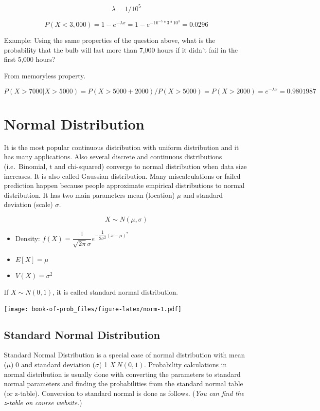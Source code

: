 \documentclass[]{book}
\theoremstyle{definition}
\theoremstyle{definition}
\theoremstyle{definition}
\theoremstyle{remark}
\begin{document}
\[\lambda = 1/10^5\]

\[P(X < 3,000) = 1 - e^{-\lambda x} = 1 - e^{- 10^{-5}*3*10^3} = 0.0296\]

Example: Using the same properties of the question above, what is the
probability that the bulb will last more than 7,000 hours if it didn't
fail in the first 5,000 hours?

From memoryless property.

\[P(X > 7000 | X > 5000) = P(X > 5000 + 2000)/P(X>5000) = P(X > 2000) = e^{-\lambda x} = 0.9801987\]

\hypertarget{normal-distribution}{%
\section{Normal Distribution}\label{normal-distribution}}

It is the most popular continuous distribution with uniform distribution
and it has many applications. Also several discrete and continuous
distributions (i.e.~Binomial, t and chi-squared) converge to normal
distribution when data size increases. It is also called Gaussian
distribution. Many miscalculations or failed prediction happen because
people approximate empirical distributions to normal distribution. It
has two main parameters mean (location) \(\mu\) and standard deviation
(scale) \(\sigma\).

\[X \sim N(\mu,\sigma)\]

\begin{itemize}
\item
  Density:
  \(f(X) = \dfrac{1}{\sqrt{2\pi}\sigma}e^{-\dfrac{1}{2\sigma^2}(x-\mu)^2}\)
\item
  \(E[X] = \mu\)
\item
  \(V(X) = \sigma^2\)
\end{itemize}

If \(X \sim N(0,1)\), it is called standard normal distribution.

\texttt{[image: book-of-prob\_files/figure-latex/norm-1.pdf]}

\hypertarget{standard-normal-distribution}{%
\subsection{Standard Normal
Distribution}\label{standard-normal-distribution}}

Standard Normal Distribution is a special case of normal distribution
with mean (\(\mu\)) 0 and standard deviation (\(\sigma\)) 1
\(X ~ N(0,1)\). Probability calculations in normal distribution is
usually done with converting the parameters to standard normal
parameters and finding the probabilities from the standard normal table
(or z-table). Conversion to standard normal is done as follows.
(\emph{You can find the z-table on course website.})
\end{document}
